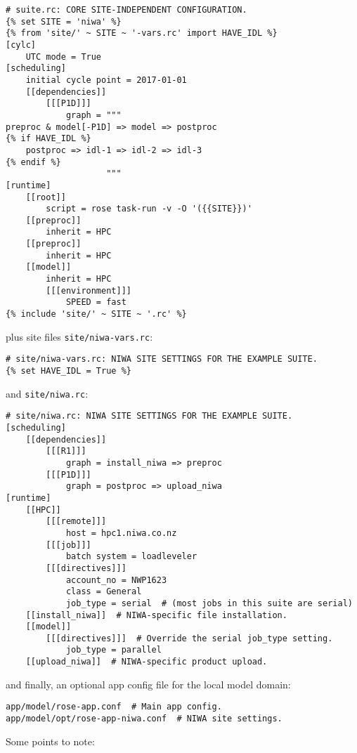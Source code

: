 \lstset{language=suiterc}
\begin{lstlisting}
# suite.rc: CORE SITE-INDEPENDENT CONFIGURATION.
{% set SITE = 'niwa' %}
{% from 'site/' ~ SITE ~ '-vars.rc' import HAVE_IDL %}
[cylc]
    UTC mode = True
[scheduling]
    initial cycle point = 2017-01-01
    [[dependencies]]
        [[[P1D]]]
            graph = """
preproc & model[-P1D] => model => postproc
{% if HAVE_IDL %}
    postproc => idl-1 => idl-2 => idl-3
{% endif %}
                    """
[runtime]
    [[root]]
        script = rose task-run -v -O '({{SITE}})'
    [[preproc]]
        inherit = HPC
    [[preproc]]
        inherit = HPC
    [[model]]
        inherit = HPC
        [[[environment]]]
            SPEED = fast
{% include 'site/' ~ SITE ~ '.rc' %}
\end{lstlisting}

plus site files \lstinline=site/niwa-vars.rc=:

\lstset{language=suiterc}
\begin{lstlisting}
# site/niwa-vars.rc: NIWA SITE SETTINGS FOR THE EXAMPLE SUITE.
{% set HAVE_IDL = True %}
\end{lstlisting}

and \lstinline=site/niwa.rc=:

\lstset{language=suiterc}
\begin{lstlisting}
# site/niwa.rc: NIWA SITE SETTINGS FOR THE EXAMPLE SUITE.
[scheduling]
    [[dependencies]]
        [[[R1]]]
            graph = install_niwa => preproc
        [[[P1D]]]
            graph = postproc => upload_niwa
[runtime]
    [[HPC]]
        [[[remote]]]
            host = hpc1.niwa.co.nz
        [[[job]]]
            batch system = loadleveler
        [[[directives]]]
            account_no = NWP1623
            class = General
            job_type = serial  # (most jobs in this suite are serial)
    [[install_niwa]]  # NIWA-specific file installation.
    [[model]]
        [[[directives]]]  # Override the serial job_type setting.
            job_type = parallel
    [[upload_niwa]]  # NIWA-specific product upload.
\end{lstlisting}

and finally, an optional app config file for the local model domain:

\lstset{language=bash}
\begin{lstlisting}
app/model/rose-app.conf  # Main app config.
app/model/opt/rose-app-niwa.conf  # NIWA site settings.
\end{lstlisting}

Some points to note:


